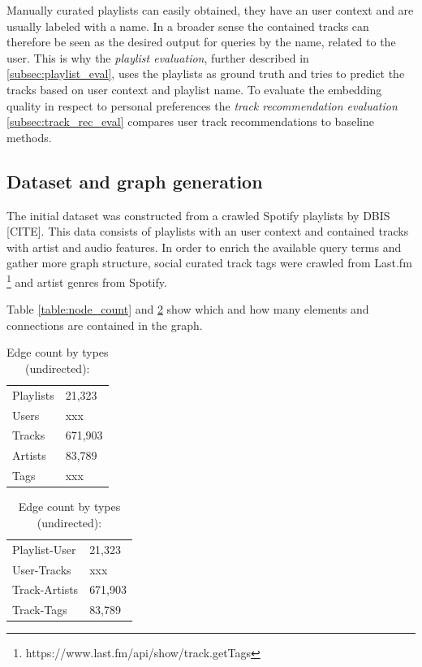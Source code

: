 \documentclass[a4paper]{llncs}
\begin{document}
	Manually curated playlists can easily obtained, they have an user context and are usually labeled with a name. In a broader sense the contained tracks can therefore be seen as the desired output for queries by the name, related to the user. This is why the \emph{playlist evaluation}, further described in \ref{subsec:playlist_eval}, uses the playlists as ground truth and tries to predict the tracks based on user context and playlist name. To evaluate the embedding quality in respect to personal preferences the \emph{track recommendation evaluation} \ref{subsec:track_rec_eval} compares user track recommendations to baseline methods.
	
	
	\subsection{Dataset and graph generation}
	The initial dataset was constructed from a crawled Spotify playlists by DBIS [CITE]. This data consists of playlists with an user context and contained tracks with artist and audio features. In order to enrich the available query terms and gather more graph structure, social curated track tags were crawled from Last.fm \footnote{https://www.last.fm/api/show/track.getTags} and artist genres from Spotify.
	
	Table \ref{table:node_count} and \ref{table:edge_count} show which and how many elements and connections are contained in the graph.
	
	\begin{table}[H]
		\begin{minipage}{.5\textwidth}
			
			\centering
			\caption{Node count by type:}
			\label{table:node_count}
			\begin{tabular}{l|l}
				Playlists & 21,323  \\
				Users     & xxx     \\
				Tracks    & 671,903 \\
				Artists   & 83,789  \\
				Tags      & xxx
			\end{tabular}
			
		\end{minipage}
		\begin{minipage}{.5\textwidth}
			
			\centering
			\caption{Edge count by types (undirected):}
			\label{table:edge_count}
			\begin{tabular}{l|l}
				Playlist-User & 21,323  \\
				User-Tracks     & xxx     \\
				Track-Artists    & 671,903 \\
				Track-Tags   & 83,789
			\end{tabular}
			
		\end{minipage}
	\end{table}
	
\end{document}
